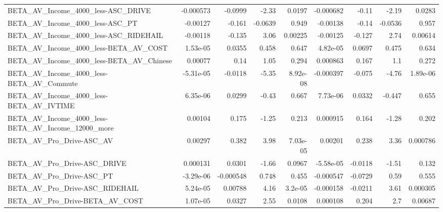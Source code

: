 \begin{tabular}{lrrrrrrrr}
BETA\_AV\_Income\_4000\_less-ASC\_DRIVE                 &   -0.000573 &      -0.0999 &     -2.33 &   0.0197 &  -0.000682 &       -0.11 &        -2.19 &        0.0283 \\
BETA\_AV\_Income\_4000\_less-ASC\_PT                    &    -0.00127 &       -0.161 &   -0.0639 &    0.949 &   -0.00138 &       -0.14 &      -0.0536 &         0.957 \\
BETA\_AV\_Income\_4000\_less-ASC\_RIDEHAIL              &    -0.00118 &       -0.135 &      3.06 &  0.00225 &   -0.00125 &      -0.127 &         2.74 &       0.00614 \\
BETA\_AV\_Income\_4000\_less-BETA\_AV\_COST              &    1.53e-05 &       0.0355 &     0.458 &    0.647 &   4.82e-05 &      0.0697 &        0.475 &         0.634 \\
BETA\_AV\_Income\_4000\_less-BETA\_AV\_Chinese           &     0.00077 &         0.14 &      1.05 &    0.294 &   0.000863 &       0.167 &          1.1 &         0.272 \\
BETA\_AV\_Income\_4000\_less-BETA\_AV\_Commute           &   -5.31e-05 &      -0.0118 &     -5.35 & 8.92e-08 &  -0.000397 &      -0.075 &        -4.76 &      1.89e-06 \\
BETA\_AV\_Income\_4000\_less-BETA\_AV\_IVTIME            &    6.35e-06 &       0.0299 &     -0.43 &    0.667 &   7.73e-06 &      0.0332 &       -0.447 &         0.655 \\
BETA\_AV\_Income\_4000\_less-BETA\_AV\_Income\_12000\_more &     0.00104 &        0.175 &     -1.25 &    0.213 &   0.000915 &       0.164 &        -1.28 &         0.202 \\
BETA\_AV\_Pro\_Drive-ASC\_AV                           &     0.00297 &        0.382 &      3.98 & 7.03e-05 &    0.00201 &       0.238 &         3.36 &      0.000786 \\
BETA\_AV\_Pro\_Drive-ASC\_DRIVE                        &    0.000131 &       0.0301 &     -1.66 &   0.0967 &  -5.58e-05 &     -0.0118 &        -1.51 &         0.132 \\
BETA\_AV\_Pro\_Drive-ASC\_PT                           &   -3.29e-06 &    -0.000548 &     0.748 &    0.455 &  -0.000547 &     -0.0729 &         0.59 &         0.555 \\
BETA\_AV\_Pro\_Drive-ASC\_RIDEHAIL                     &    5.24e-05 &      0.00788 &      4.16 &  3.2e-05 &  -0.000158 &     -0.0211 &         3.61 &      0.000305 \\
BETA\_AV\_Pro\_Drive-BETA\_AV\_COST                     &    1.07e-05 &       0.0327 &      2.55 &   0.0108 &   0.000108 &       0.204 &          2.7 &       0.00687 \\

\end{tabular}
